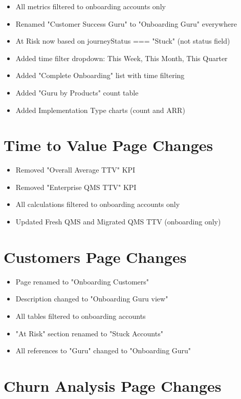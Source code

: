 \documentclass[12pt,a4paper]{article}
\begin{document}
\begin{itemize}[leftmargin=*]
    \item All metrics filtered to onboarding accounts only
    \item Renamed "Customer Success Guru" to "Onboarding Guru" everywhere
    \item At Risk now based on journeyStatus === "Stuck" (not status field)
    \item Added time filter dropdown: This Week, This Month, This Quarter
    \item Added "Complete Onboarding" list with time filtering
    \item Added "Guru by Products" count table
    \item Added Implementation Type charts (count and ARR)
\end{itemize}

\section*{Time to Value Page Changes}

\begin{itemize}[leftmargin=*]
    \item Removed "Overall Average TTV" KPI
    \item Removed "Enterprise QMS TTV" KPI
    \item All calculations filtered to onboarding accounts only
    \item Updated Fresh QMS and Migrated QMS TTV (onboarding only)
\end{itemize}

\section*{Customers Page Changes}

\begin{itemize}[leftmargin=*]
    \item Page renamed to "Onboarding Customers"
    \item Description changed to "Onboarding Guru view"
    \item All tables filtered to onboarding accounts
    \item "At Risk" section renamed to "Stuck Accounts"
    \item All references to "Guru" changed to "Onboarding Guru"
\end{itemize}

\section*{Churn Analysis Page Changes}
\end{document}

